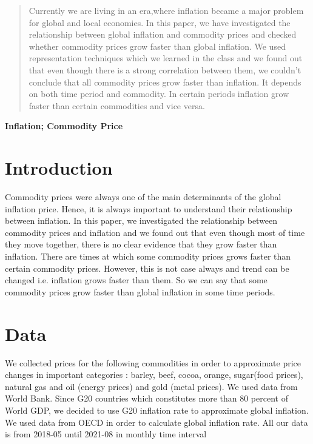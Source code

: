 \documentclass{scrartcl}
\begin{document}
\vspace{1cm}

\begin{abstract}
	   Currently we are living in an era,where inflation became a major problem for global and local economies. In this paper, we have investigated the relationship between global inflation and commodity prices and checked whether commodity prices grow faster than global inflation. We used representation techniques which we learned in the class and we found out that even though there is a strong correlation between them, we couldn't conclude that all commodity prices grow faster than inflation. It depends on both time period and commodity. In certain periods inflation grow faster than certain commodities and vice versa.
\end{abstract}
\vspace{1cm}

\begin{keywords}
\centering
       \textbf{Inflation; Commodity Price}
\end{keywords}

\newpage



\doublespacing
\tableofcontents
\singlespacing

\newpage

\doublespacing

\section{Introduction}

Commodity prices were always one of the main determinants of the global inflation price. Hence, it is always important to understand their relationship between inflation. In this paper, we investigated the relationship between commodity prices and inflation and we found out that even though most of time they move together, there is no clear evidence that they grow faster than inflation. There are times at which some commodity prices grows faster than certain commodity prices. However, this is not case always and trend can be changed i.e. inflation grows faster than them. So we can say that some commodity prices grow faster than global inflation in some time periods.

\section{Data}
 We collected prices for the following commodities in order to approximate price changes in important categories : barley, beef, cocoa, orange, sugar(food prices), natural gas and oil (energy prices) and gold (metal prices). We used data from World Bank. Since G20 countries which constitutes more than 80 percent of World GDP, we decided to use G20 inflation rate to approximate global inflation. We used data from OECD in order to calculate global inflation rate. All our data is from 2018-05 until 2021-08 in monthly time interval
\end{document}
